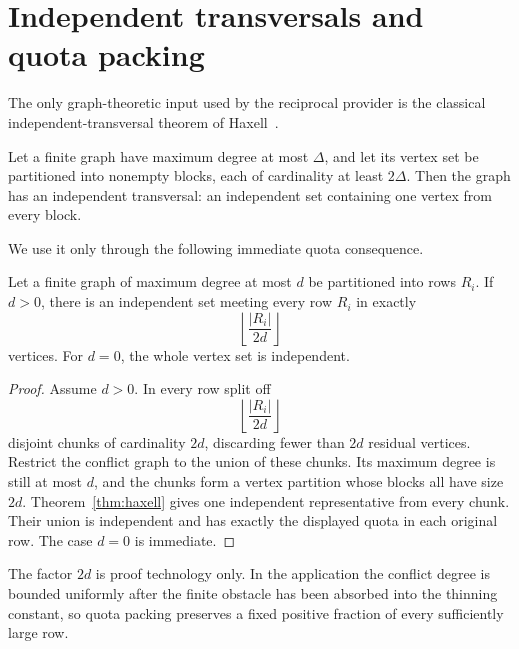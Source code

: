 \section{Independent transversals and quota packing}
\label{app:packing}

The only graph-theoretic input used by the reciprocal provider is the classical
independent-transversal theorem of Haxell~\cite{Haxell1995,Haxell2001}.

\begin{theorem}[Haxell]\label{thm:haxell}
Let a finite graph have maximum degree at most $\Delta$, and let its vertex set
be partitioned into nonempty blocks, each of cardinality at least $2\Delta$.
Then the graph has an independent transversal: an independent set containing
one vertex from every block.
\end{theorem}

We use it only through the following immediate quota consequence.

\begin{proposition}\label{thm:quota-packing}
Let a finite graph of maximum degree at most $d$ be partitioned into rows
$R_i$.  If $d>0$, there is an independent set meeting every row $R_i$ in
exactly
\[
\left\lfloor\frac{|R_i|}{2d}\right\rfloor
\]
vertices.  For $d=0$, the whole vertex set is independent.
\end{proposition}

\begin{proof}
Assume $d>0$.  In every row split off
\[
\left\lfloor\frac{|R_i|}{2d}\right\rfloor
\]
disjoint chunks of cardinality $2d$, discarding fewer than $2d$ residual
vertices.  Restrict the conflict graph to the union of these chunks.  Its
maximum degree is still at most $d$, and the chunks form a vertex partition
whose blocks all have size $2d$.  Theorem~\ref{thm:haxell} gives one independent
representative from every chunk.  Their union is independent and has exactly
the displayed quota in each original row.  The case $d=0$ is immediate.
\end{proof}

The factor $2d$ is proof technology only.  In the application the conflict
degree is bounded uniformly after the finite obstacle has been absorbed into
the thinning constant, so quota packing preserves a fixed positive fraction of
every sufficiently large row.
